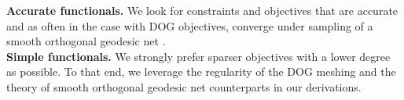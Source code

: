 \textbf{Accurate functionals.} We look for constraints and objectives that are accurate and as often in the case with DOG objectives, converge under sampling of a smooth orthogonal geodesic net \cite{rabi18,rabi2018shape}. \\
\textbf{Simple functionals.} We strongly prefer sparser objectives with a lower degree as possible. To that end, we leverage the regularity of the DOG meshing and the theory of smooth orthogonal geodesic net counterparts in our derivations. \\

